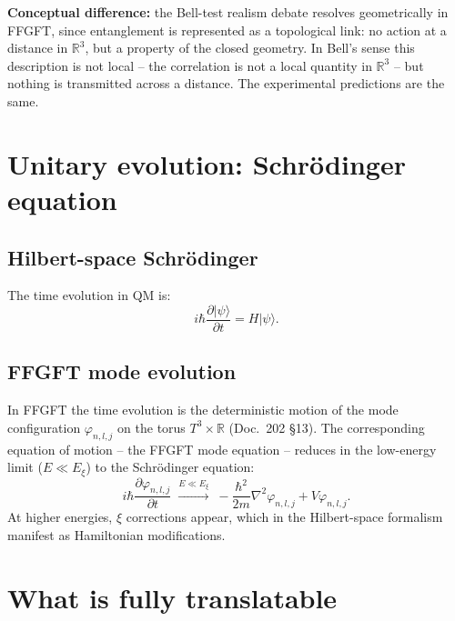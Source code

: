 \textbf{Conceptual difference:} the Bell-test realism debate
resolves geometrically in FFGFT, since entanglement is represented
as a topological link: no action at a distance in $\mathbb{R}^3$, but
a property of the closed geometry. In Bell's sense this description is
not local -- the correlation is not a local quantity in
$\mathbb{R}^3$ -- but nothing is transmitted across a distance. The
experimental predictions are the same.

\section{Unitary evolution: Schrödinger equation}

\subsection{Hilbert-space Schrödinger}

The time evolution in QM is:
\begin{equation}
  i\hbar \frac{\partial |\psi\rangle}{\partial t} = H |\psi\rangle.
\end{equation}

\subsection{FFGFT mode evolution}

In FFGFT the time evolution is the deterministic motion of the
mode configuration $\varphi_{n,l,j}$ on the torus
$T^3 \times \mathbb{R}$ (Doc.~202 §13). The corresponding
equation of motion -- the FFGFT mode equation -- reduces in the
low-energy limit ($E \ll E_\xi$) to the Schrödinger equation:
\begin{equation}
  i\hbar \frac{\partial \varphi_{n,l,j}}{\partial t}
  \;\xrightarrow{E \ll E_\xi}\;
  -\frac{\hbar^2}{2m}\nabla^2 \varphi_{n,l,j} + V \varphi_{n,l,j}.
\end{equation}
At higher energies, $\xi$ corrections appear, which in the
Hilbert-space formalism manifest as Hamiltonian modifications.

\section{What is fully translatable}

